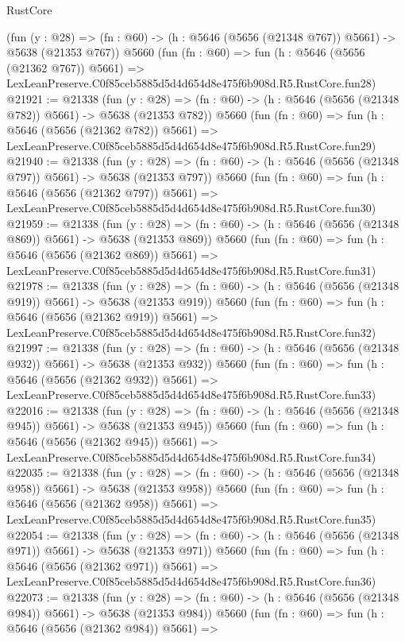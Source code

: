 \begin{lexlean}{RustCore}
\begin{coremodule}
    (fun (y : @28) => (fn : @60) -> (h : @5646 (@5656 (@21348 @767)) @5661) -> @5638 (@21353 @767))
    @5660
    (fun (fn : @60) =>
    fun (h : @5646 (@5656 (@21362 @767)) @5661) =>
    LexLeanPreserve.C0f85ceb5885d5d4d654d8e475f6b908d.R5.RustCore.fun28)
@21921 := @21338
    (fun (y : @28) => (fn : @60) -> (h : @5646 (@5656 (@21348 @782)) @5661) -> @5638 (@21353 @782))
    @5660
    (fun (fn : @60) =>
    fun (h : @5646 (@5656 (@21362 @782)) @5661) =>
    LexLeanPreserve.C0f85ceb5885d5d4d654d8e475f6b908d.R5.RustCore.fun29)
@21940 := @21338
    (fun (y : @28) => (fn : @60) -> (h : @5646 (@5656 (@21348 @797)) @5661) -> @5638 (@21353 @797))
    @5660
    (fun (fn : @60) =>
    fun (h : @5646 (@5656 (@21362 @797)) @5661) =>
    LexLeanPreserve.C0f85ceb5885d5d4d654d8e475f6b908d.R5.RustCore.fun30)
@21959 := @21338
    (fun (y : @28) => (fn : @60) -> (h : @5646 (@5656 (@21348 @869)) @5661) -> @5638 (@21353 @869))
    @5660
    (fun (fn : @60) =>
    fun (h : @5646 (@5656 (@21362 @869)) @5661) =>
    LexLeanPreserve.C0f85ceb5885d5d4d654d8e475f6b908d.R5.RustCore.fun31)
@21978 := @21338
    (fun (y : @28) => (fn : @60) -> (h : @5646 (@5656 (@21348 @919)) @5661) -> @5638 (@21353 @919))
    @5660
    (fun (fn : @60) =>
    fun (h : @5646 (@5656 (@21362 @919)) @5661) =>
    LexLeanPreserve.C0f85ceb5885d5d4d654d8e475f6b908d.R5.RustCore.fun32)
@21997 := @21338
    (fun (y : @28) => (fn : @60) -> (h : @5646 (@5656 (@21348 @932)) @5661) -> @5638 (@21353 @932))
    @5660
    (fun (fn : @60) =>
    fun (h : @5646 (@5656 (@21362 @932)) @5661) =>
    LexLeanPreserve.C0f85ceb5885d5d4d654d8e475f6b908d.R5.RustCore.fun33)
@22016 := @21338
    (fun (y : @28) => (fn : @60) -> (h : @5646 (@5656 (@21348 @945)) @5661) -> @5638 (@21353 @945))
    @5660
    (fun (fn : @60) =>
    fun (h : @5646 (@5656 (@21362 @945)) @5661) =>
    LexLeanPreserve.C0f85ceb5885d5d4d654d8e475f6b908d.R5.RustCore.fun34)
@22035 := @21338
    (fun (y : @28) => (fn : @60) -> (h : @5646 (@5656 (@21348 @958)) @5661) -> @5638 (@21353 @958))
    @5660
    (fun (fn : @60) =>
    fun (h : @5646 (@5656 (@21362 @958)) @5661) =>
    LexLeanPreserve.C0f85ceb5885d5d4d654d8e475f6b908d.R5.RustCore.fun35)
@22054 := @21338
    (fun (y : @28) => (fn : @60) -> (h : @5646 (@5656 (@21348 @971)) @5661) -> @5638 (@21353 @971))
    @5660
    (fun (fn : @60) =>
    fun (h : @5646 (@5656 (@21362 @971)) @5661) =>
    LexLeanPreserve.C0f85ceb5885d5d4d654d8e475f6b908d.R5.RustCore.fun36)
@22073 := @21338
    (fun (y : @28) => (fn : @60) -> (h : @5646 (@5656 (@21348 @984)) @5661) -> @5638 (@21353 @984))
    @5660
    (fun (fn : @60) =>
    fun (h : @5646 (@5656 (@21362 @984)) @5661) =>

\end{coremodule}
\end{lexlean}

